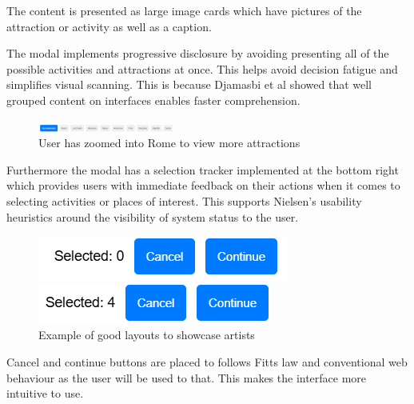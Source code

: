\documentclass[]{project_final}
\begin{document}
The content is presented as large image cards which have pictures of the attraction or activity as well as a caption.

The modal implements progressive disclosure by avoiding presenting all of the possible activities and attractions at once. This helps avoid decision fatigue and simplifies visual scanning. This is because Djamasbi et al showed that well grouped content on interfaces enables faster comprehension.

\begin{figure}[ht!]
  \centering
  \includegraphics[width=0.4\textwidth]{tabs.png}
  \caption{User has zoomed into Rome to view more attractions}
  \label{fig:1}
\end{figure}

Furthermore the modal has a selection tracker implemented at the bottom right which provides users with immediate feedback on their actions when it comes to selecting activities or places of interest. This supports Nielsen's usability heuristics around the visibility of system status to the user.

\begin{figure}[ht!]
  \centering
  \begin{minipage}[t]{0.4\textwidth}
    \includegraphics[width=\textwidth]{0 selected.png}
  \end{minipage}
  \hfill
  \begin{minipage}[t]{0.4\textwidth}
    \includegraphics[width=\textwidth]{4 selected.png}
  \end{minipage}
  \caption{Example of good layouts to showcase artists}
  \label{fig:1}
\end{figure}

Cancel and continue buttons are placed to follows Fitts law and conventional web behaviour as the user will be used to that. This makes the interface more intuitive to use.
\end{document}
